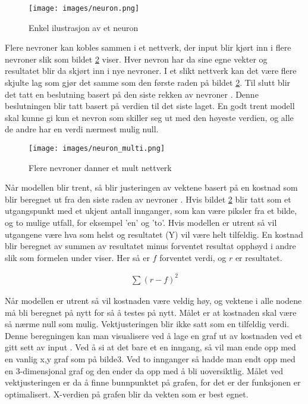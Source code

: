 \begin{figure}[ht]
    \centering
    \texttt{[image: images/neuron.png]}
    \caption{Enkel ilustrasjon av et neuron}
    \label{fig:neuron}
\end{figure}
\newpage
Flere nevroner kan kobles sammen i et nettverk, der input blir kjørt inn i flere nevroner slik som bildet \ref{fig:nettverk} viser. Hver nevron har da sine egne vekter og resultatet blir da skjørt inn i nye nevroner. I et slikt nettverk kan det være flere skjulte lag som gjør det samme som den første raden på bildet \ref{fig:nettverk}. Til slutt blir det tatt en beslutning basert på den siste rekken av nevroner \cite{Bonaccorso2017}. Denne beslutningen blir tatt basert på verdien til det siste laget. En godt trent modell skal kunne gi kun et nevron som skiller seg ut med den høyeste verdien, og alle de andre har en verdi nærmest mulig null.

\begin{figure}[ht]
    \centering
    \texttt{[image: images/neuron\_multi.png]}
    \caption{Flere nevroner danner et mult nettverk}
    \label{fig:nettverk}
\end{figure}

Når modellen blir trent, så blir justeringen av vektene basert på en kostnad som blir beregnet ut fra den siste raden av nevroner \cite{neural_net}. Hvis bildet \ref{fig:nettverk} blir tatt som et utgangspunkt med et ukjent antall innganger, som kan være piksler fra et bilde, og to mulige utfall, for eksempel ’en’ og ’to’. Hvis modellen er utrent så vil utgangene være hva som helst og resultatet (Y) vil være helt tilfeldig. En kostnad  blir beregnet av summen av resultatet minus forventet resultat opphøyd i andre slik som formelen under viser. Her så er $f$ forventet verdi, og $r$ er resultatet.

\begin{align}
	\sum{(r-f)^2}
\end{align}

Når modellen er utrent så vil kostnaden være veldig høy, og vektene i alle nodene må bli beregnet på nytt for så å testes på nytt. Målet er at kostnaden skal være så nærme null som mulig.\newline
Vektjusteringen blir ikke satt som en tilfeldig verdi. Denne beregningen kan man visualisere ved å lage en graf ut av kostnaden ved et gitt sett av input \cite{neural_net}. Ved å si at det bare et en inngang, så vil man ende opp med en vanlig x,y graf som på bilde3. Ved to innganger så hadde man endt opp med en 3-dimensjonal graf og den ender da opp med å bli uoversiktlig. Målet ved vektjusteringen er da å finne bunnpunktet på grafen, for det er der funksjonen er optimalisert. X-verdien på grafen blir da vekten som er best egnet.

